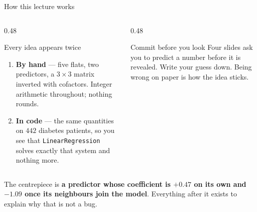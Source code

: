 \documentclass[aspectratio=169]{beamer}
\begin{document}
\begin{frame}[shrink=6]{How this lecture works}
  \begin{columns}[T]
    \begin{column}{0.48\textwidth}
      \begin{block}{Every idea appears twice}
        \begin{enumerate}
          \item \textbf{By hand} --- five flats, two predictors, a
            $3\times3$ matrix inverted with cofactors. Integer arithmetic
            throughout; nothing rounds.
          \item \textbf{In code} --- the same quantities on $442$ diabetes
            patients, so you see that \texttt{LinearRegression} solves
            exactly that system and nothing more.
        \end{enumerate}
      \end{block}
    \end{column}
    \begin{column}{0.48\textwidth}
      \begin{alertblock}{Commit before you look}
        Four slides ask you to predict a number before it is revealed. Write
        your guess down. Being wrong on paper is how the idea sticks.
      \end{alertblock}
    \end{column}
  \end{columns}
  \vspace{0.4em}
  \begin{center}
    \small The centrepiece is \textbf{a predictor whose coefficient is
    $+0.47$ on its own and $-1.09$ once its neighbours join the model}.
    Everything after it exists to explain why that is not a bug.
  \end{center}
\end{frame}
\end{document}
